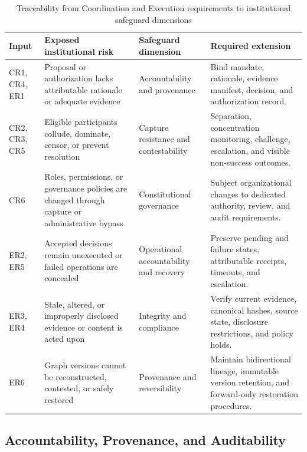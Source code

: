 \documentclass[journal]{IEEEtran}
\begin{document}
\begin{table}[t]
\caption{Traceability from Coordination and Execution requirements
to institutional safeguard dimensions}
\label{tab:safeguard_traceability}
\centering
\renewcommand{\arraystretch}{1.12}
\setlength{\tabcolsep}{4pt}
\begin{tabular}{p{2.2cm}p{4.8cm}p{4.2cm}p{5.8cm}}
\hline
\textbf{Input} &
\textbf{Exposed institutional risk} &
\textbf{Safeguard dimension} &
\textbf{Required extension}\\
\hline

CR1, CR4, ER1 &
Proposal or authorization lacks attributable rationale
or adequate evidence &
Accountability and provenance &
Bind mandate, rationale, evidence manifest, decision,
and authorization record.\\

CR2, CR3, CR5 &
Eligible participants collude, dominate, censor,
or prevent resolution &
Capture resistance and contestability &
Separation, concentration monitoring, challenge,
escalation, and visible non-success outcomes.\\

CR6 &
Roles, permissions, or governance policies are changed
through capture or administrative bypass &
Constitutional governance &
Subject organizational changes to dedicated authority,
review, and audit requirements.\\

ER2, ER5 &
Accepted decisions remain unexecuted or failed
operations are concealed &
Operational accountability and recovery &
Preserve pending and failure states, attributable
receipts, timeouts, and escalation.\\

ER3, ER4 &
Stale, altered, or improperly disclosed evidence
or content is acted upon &
Integrity and compliance &
Verify current evidence, canonical hashes, source state,
disclosure restrictions, and policy holds.\\

ER6 &
Graph versions cannot be reconstructed, contested,
or safely restored &
Provenance and reversibility &
Maintain bidirectional lineage, immutable version
retention, and forward-only restoration procedures.\\

\hline
\end{tabular}
\end{table}

\subsection{Accountability, Provenance, and Auditability}
\label{sec:accountability}
\end{document}
